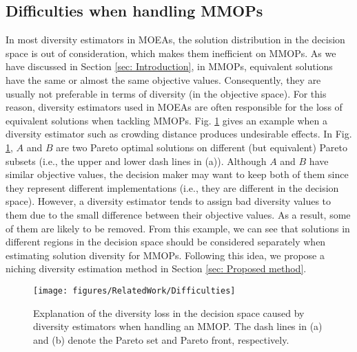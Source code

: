 \subsection{Difficulties when handling MMOPs}
In most diversity estimators in MOEAs, the solution distribution in the decision space is out of consideration, which makes them inefficient on MMOPs. As we have discussed in Section \ref{sec: Introduction}, in MMOPs, equivalent solutions have the same or almost the same objective values. Consequently, they are usually not preferable in terms of diversity (in the objective space). For this reason, diversity estimators used in MOEAs are often responsible for the loss of equivalent solutions when tackling MMOPs. Fig. \ref{fig: Difficulty when handling MMOPs} gives an example when a diversity estimator such as crowding distance produces undesirable effects. In Fig. \ref{fig: Difficulty when handling MMOPs}, $A$ and $B$ are two Pareto optimal solutions on different (but equivalent) Pareto subsets (i.e., the upper and lower dash lines in (a)). Although $A$ and $B$ have similar objective values, the decision maker may want to keep both of them since they represent different implementations (i.e., they are different in the decision space). However, a diversity estimator tends to assign bad diversity values to them due to the small difference between their objective values. As a result, some of them are likely to be removed. From this example, we can see that solutions in different regions in the decision space should be considered separately when estimating solution diversity for MMOPs. Following this idea, we propose a niching diversity estimation method in Section \ref{sec: Proposed method}.

\begin{figure}
	\centering
	\texttt{[image: figures/RelatedWork/Difficulties]}
	\caption{Explanation of the diversity loss in the decision space caused by diversity estimators when handling an MMOP. The dash lines in (a) and (b) denote the Pareto set and Pareto front, respectively.}
	\label{fig: Difficulty when handling MMOPs}
\end{figure}

